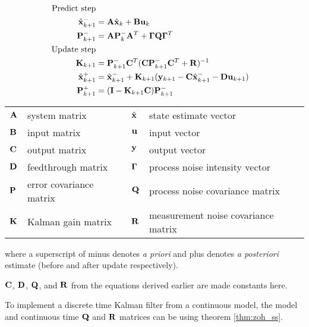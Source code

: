 \begin{theorem}
  \label{thm:kalman_filter}

  \begin{align}
    \text{Predict step} \nonumber \\
    \hat{\mathbf{x}}_{k+1}^- &= \mathbf{A}\hat{\mathbf{x}}_k + \mathbf{B} \mathbf{u}_k
      \label{eq:pre1_x} \\
    \mathbf{P}_{k+1}^- &= \mathbf{A} \mathbf{P}_k^- \mathbf{A}^T +
      \mathbf{\Gamma}\mathbf{Q}\mathbf{\Gamma}^T \\
    \text{Update step} \nonumber \\
    \mathbf{K}_{k+1} &=
      \mathbf{P}_{k+1}^- \mathbf{C}^T (\mathbf{C}\mathbf{P}_{k+1}^- \mathbf{C}^T +
      \mathbf{R})^{-1} \\
    \hat{\mathbf{x}}_{k+1}^+ &=
      \hat{\mathbf{x}}_{k+1}^- + \mathbf{K}_{k+1}(\mathbf{y}_{k+1} -
      \mathbf{C} \hat{\mathbf{x}}_{k+1}^- - \mathbf{D}\mathbf{u}_{k+1}) \label{eq:post1_x}
      \\
    \mathbf{P}_{k+1}^+ &= (\mathbf{I} - \mathbf{K}_{k+1}\mathbf{C})\mathbf{P}_{k+1}^-
  \end{align}

  \begin{figurekey}
    \begin{tabular}{llll}
      $\mathbf{A}$ & system matrix & $\hat{\mathbf{x}}$ & state estimate vector \\
      $\mathbf{B}$ & input matrix       & $\mathbf{u}$ & input vector \\
      $\mathbf{C}$ & output matrix      & $\mathbf{y}$ & output vector \\
      $\mathbf{D}$ & feedthrough matrix & $\mathbf{\Gamma}$ & process noise intensity
        vector \\
      $\mathbf{P}$ & error covariance matrix & $\mathbf{Q}$ & process noise covariance
        matrix \\
      $\mathbf{K}$ & Kalman gain matrix & $\mathbf{R}$ & measurement noise covariance
        matrix
    \end{tabular}
  \end{figurekey}

  where a superscript of minus denotes \textit{a priori} and plus denotes
  \textit{a posteriori} estimate (before and after update respectively).
\end{theorem}

$\mathbf{C}$, $\mathbf{D}$, $\mathbf{Q}$, and $\mathbf{R}$ from the equations derived
earlier are made constants here.

\begin{remark}
  To implement a discrete time Kalman filter from a continuous model, the model
  and continuous time $\mathbf{Q}$ and $\mathbf{R}$ matrices can be
   using theorem \ref{thm:zoh_ss}.
\end{remark}


